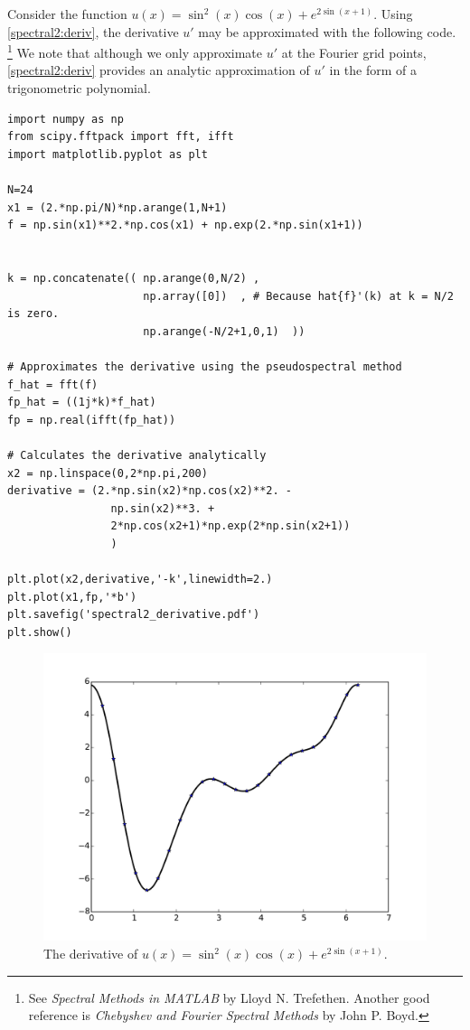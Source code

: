 Consider the function $u(x) = \sin^2 (x) \cos(x) +e^{2\sin(x+1)}$. 
Using \eqref{spectral2:deriv}, the derivative $u'$ may be approximated with the following code.  \footnote{See \textit{Spectral Methods in MATLAB} by Lloyd N. Trefethen.  Another good reference is \textit{Chebyshev and Fourier Spectral Methods} by John P. Boyd.}
We note that although we only approximate $u'$ at the Fourier grid points, \eqref{spectral2:deriv} provides an analytic approximation of $u'$ in the form of a trigonometric polynomial.

\begin{lstlisting}
import numpy as np
from scipy.fftpack import fft, ifft
import matplotlib.pyplot as plt

N=24
x1 = (2.*np.pi/N)*np.arange(1,N+1)
f = np.sin(x1)**2.*np.cos(x1) + np.exp(2.*np.sin(x1+1))


k = np.concatenate(( np.arange(0,N/2) ,
					 np.array([0])	, # Because hat{f}'(k) at k = N/2 is zero.
					 np.arange(-N/2+1,0,1)	))

# Approximates the derivative using the pseudospectral method
f_hat = fft(f)
fp_hat = ((1j*k)*f_hat)
fp = np.real(ifft(fp_hat))

# Calculates the derivative analytically
x2 = np.linspace(0,2*np.pi,200)
derivative = (2.*np.sin(x2)*np.cos(x2)**2. - 
				np.sin(x2)**3. + 
				2*np.cos(x2+1)*np.exp(2*np.sin(x2+1))
				)

plt.plot(x2,derivative,'-k',linewidth=2.)
plt.plot(x1,fp,'*b')
plt.savefig('spectral2_derivative.pdf')
plt.show()

\end{lstlisting}




\begin{figure}
\centering
\includegraphics[width=\textwidth]{spectral2_derivative.pdf}
\caption{The derivative of $u(x) = \sin^2 (x) \cos(x) +e^{2\sin(x+1)}$.}
\label{fig:spectral:spectral2_derivative}
\end{figure}


